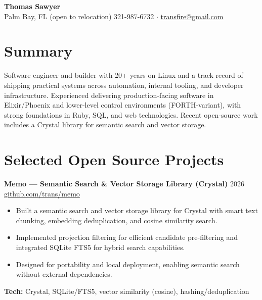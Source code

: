 \documentclass[11pt]{article}
\begin{document}
{\LARGE \textbf{Thomas Sawyer}}\\
Palm Bay, FL (open to relocation) \hfill 321-987-6732 \quad $\cdot$ \quad \href{mailto:transfire@gmail.com}{transfire@gmail.com}

\section*{Summary}
Software engineer and builder with 20+ years on Linux and a track record of shipping practical systems across automation, internal tooling, and developer infrastructure. Experienced delivering production-facing software in Elixir/Phoenix and lower-level control environments (FORTH-variant), with strong foundations in Ruby, SQL, and web technologies. Recent open-source work includes a Crystal library for semantic search and vector storage.


\section*{Selected Open Source Projects}

\vspace{6pt}
\textbf{Memo --- Semantic Search \& Vector Storage Library (Crystal)} \hfill 2026\\
\href{https://github.com/trans/memo}{github.com/trans/memo}
\vspace{2pt}
\begin{itemize}
  \item Built a semantic search and vector storage library for Crystal with smart text chunking, embedding deduplication, and cosine similarity search.
  \item Implemented projection filtering for efficient candidate pre-filtering and integrated SQLite FTS5 for hybrid search capabilities.
  \item Designed for portability and local deployment, enabling semantic search without external dependencies.
\end{itemize}
\vspace{6pt}
\textbf{Tech:} Crystal, SQLite/FTS5, vector similarity (cosine), hashing/deduplication

\vspace{12pt}
\end{document}
